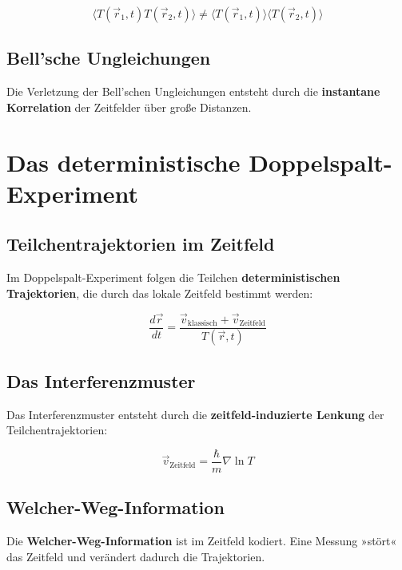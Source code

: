 \documentclass[12pt,a4paper]{report}
\begin{document}
	\begin{equation}
		\langle T(\vec{r}_1,t) T(\vec{r}_2,t)\rangle \neq \langle T(\vec{r}_1,t)\rangle \langle T(\vec{r}_2,t)\rangle
	\end{equation}
	
	\subsection{Bell'sche Ungleichungen}
	
	Die Verletzung der Bell'schen Ungleichungen entsteht durch die \textbf{instantane Korrelation} der Zeitfelder über große Distanzen.
	
	\section{Das deterministische Doppelspalt-Experiment}
	
	\subsection{Teilchentrajektorien im Zeitfeld}
	
	Im Doppelspalt-Experiment folgen die Teilchen \textbf{deterministischen Trajektorien}, die durch das lokale Zeitfeld bestimmt werden:
	
	\begin{equation}
		\frac{d\vec{r}}{dt} = \frac{\vec{v}_{\text{klassisch}} + \vec{v}_{\text{Zeitfeld}}}{T(\vec{r},t)}
	\end{equation}
	
	\subsection{Das Interferenzmuster}
	
	Das Interferenzmuster entsteht durch die \textbf{zeitfeld-induzierte Lenkung} der Teilchentrajektorien:
	
	\begin{equation}
		\vec{v}_{\text{Zeitfeld}} = \frac{\hbar}{m}\nabla\ln T
	\end{equation}
	
	\subsection{Welcher-Weg-Information}
	
	Die \textbf{Welcher-Weg-Information} ist im Zeitfeld kodiert. Eine Messung »stört« das Zeitfeld und verändert dadurch die Trajektorien.
	
\end{document}
